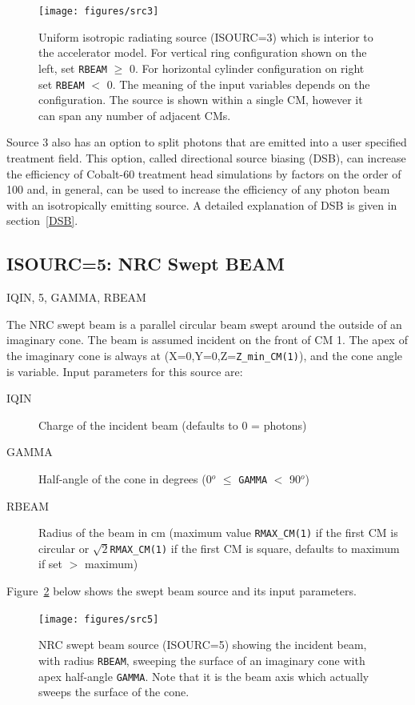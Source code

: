 \documentclass[12pt,twoside]{article}
\newcommand{\cen}[1]{\begin{center} #1 \end{center}                   }
\begin{document}
\begin{figure}[htbp]
\begin{center}
\leavevmode
\vspace{-0.8cm}
\mbox{}\hspace{0cm}
\texttt{[image: figures/src3]}
\caption[ISOURC=3: Interior isotropic cylindrical source.]
{Uniform isotropic radiating source (ISOURC=3) which is interior to
the accelerator model.  For vertical ring
configuration shown on the left, set
{\tt RBEAM} $\geq$ 0.  For horizontal cylinder configuration on
right set {\tt RBEAM} $<$ 0.  The meaning of the
input variables depends on the configuration.  The
source is shown within a single CM, however it can span any number of
adjacent CMs.}
\label{fig_src3}
\end{center}
\end{figure}

Source 3 also has an option to split photons that are emitted into a user
specified treatment field. This option, called directional source biasing (DSB),
can increase the efficiency of Cobalt-60 treatment head simulations by factors
on the order of 100 and, in general, can be used to increase the efficiency of
any photon beam with an isotropically emitting source.  A detailed explanation
of DSB is given in section~\ref{DSB}.

\clearpage
\subsection{ISOURC=5: NRC Swept BEAM}
\cen{IQIN, 5, GAMMA, RBEAM}
The NRC swept beam is a parallel circular beam
swept around the outside
of an imaginary cone.  The beam is assumed incident on the front of CM
1.  The apex of the imaginary cone is always at
(X=0,Y=0,Z=\verb+Z_min_CM(1)+), and the cone angle is variable.
Input parameters for this source are:
\begin{description}
\item [IQIN] Charge of the incident beam (defaults to 0 = photons)
\item [GAMMA] Half-angle of the cone in degrees (0$^o$ $\leq$ \verb+GAMMA+ $<$
90$^o$)
\item [RBEAM] Radius of the beam in cm (maximum value \verb+RMAX_CM(1)+
 if the
first CM
is circular or $\sqrt{2}$\verb+RMAX_CM(1)+
 if the first CM is square, defaults to
maximum if set $>$ maximum)
\end{description}
Figure~\ref{fig_src5} below shows the swept beam source and its input
parameters.
\begin{figure}[htbp]
\begin{center}
\leavevmode
\mbox{}\hspace{0cm}
\texttt{[image: figures/src5]}
\caption[ISOURC=5: NRC swept beam]
{NRC swept beam source (ISOURC=5) showing the incident beam, with radius
{\tt RBEAM},
sweeping the surface of an imaginary cone with apex half-angle {\tt GAMMA}.
Note that it is the beam axis which actually sweeps the surface of the
cone.}
\label{fig_src5}
\end{center}
\end{figure}
\end{document}
